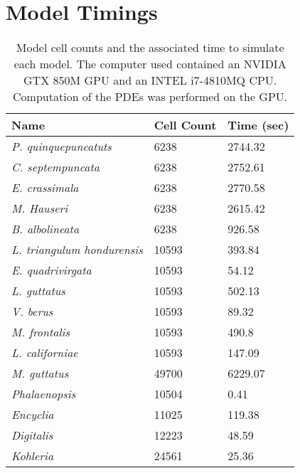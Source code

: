 \chapter{Model Timings}
\begin{table}[h]
\centering
\begin{tabular}{lll} \hline
\textbf{Name}        & \textbf{Cell Count} & \textbf{Time (sec)} \\ \hline
\textit{P. quinquepuncatuts }  & 6238                & 2744.32             \\
\textit{C. septempuncata}      & 6238                & 2752.61             \\
\textit{E. crassimala}         & 6238                & 2770.58             \\
\textit{M. Hauseri}            & 6238                & 2615.42             \\
\textit{B. albolineata}        & 6238                & 926.58              \\
\textit{L. triangulum hondurensis}          & 10593               & 393.84              \\
\textit{E. quadrivirgata}      & 10593               & 54.12               \\
\textit{L. guttatus}   & 10593               & 502.13              \\
\textit{V. berus}         & 10593               & 89.32               \\
\textit{M. frontalis}        & 10593               & 490.8               \\
\textit{L. californiae} & 10593               & 147.09              \\
\textit{M. guttatus}        & 49700               & 6229.07             \\
\textit{Phalaenopsis}  & 10504               & 0.41                \\
\textit{Encyclia}      & 11025               & 119.38              \\
\textit{Digitalis}            & 12223               & 48.59               \\
\textit{Kohleria}             & 24561               & 25.36              \\ \hline
\end{tabular}
\caption[Model cell counts and the associated time to simulate each model]{Model cell counts and the associated time to simulate each model. The computer used contained an NVIDIA GTX 850M GPU and an INTEL i7-4810MQ CPU. Computation of the PDEs was performed on the GPU.}
\label{tab:software-performance}
\end{table}


